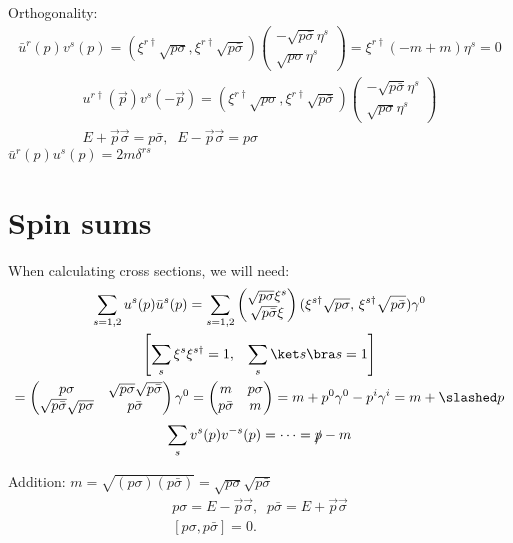 \documentclass[]{scrartcl}
\begin{document}
Orthogonality:
\begin{gather}
	\bar u^r(p) v^s(p) = (\xi^{r\dagger} \sqrt{p\sigma}, \xi^{r\dagger}\sqrt{p\bar\sigma})
	\begin{pmatrix}
		-\sqrt{p\bar\sigma}\eta^s \\ \sqrt{p\sigma}\eta^s
	\end{pmatrix} = \xi^{r\dagger}(-m + m)\eta^s = 0
\end{gather}
\begin{gather}
	u^{r\dagger}(\vec p)v^s(-\vec p) = (\xi^{r\dagger}\sqrt{p\sigma}, \xi^{r\dagger}\sqrt{p\bar\sigma})
	\begin{pmatrix}
		-\sqrt{p\bar\sigma}\eta^s\\
		\sqrt{p\sigma}\eta^s
	\end{pmatrix}\\
	E + \vec p \vec\sigma = p\bar\sigma,\;\; E - \vec p \vec\sigma = p\sigma
\end{gather}
$\bar u^r(p)u^s(p) = 2m\delta^{rs}$

\section{Spin sums}
When calculating cross sections, we will need:
\begin{gather}
	\sum_{s = 1,2} u^s(p)\bar u^s(p) = 
	\sum_{s=1,2}
	\begin{pmatrix}
		\sqrt{p\sigma}\xi^s \\ \sqrt{p\bar\sigma}\xi
	\end{pmatrix}
	(\xi^{s\dagger}\sqrt{p\sigma},\, \xi^{s\dagger}\sqrt{p\bar\sigma})\gamma^0\\
	\left[\sum_s \xi^s \xi^{s\dagger} = 1,\;\;\; \sum_s \ket s \bra s = 1\right]\\
	=
	\begin{pmatrix}
		p\sigma & \sqrt{p\sigma}\sqrt{p\bar\sigma}\\
		\sqrt{p\bar\sigma}\sqrt{p\sigma} & p\bar\sigma
	\end{pmatrix} \gamma^0 =
	\begin{pmatrix}
		m & p\sigma\\
		p\bar\sigma & m
	\end{pmatrix} = m + p^0\gamma^0 - p^i\gamma^i = m + \slashed p
\end{gather}
\begin{gather}
	\sum_s v^s(p)v^{-s}(p) = \cdots = \slashed p - m
\end{gather}

Addition: $m = \sqrt{(p\sigma)(p\bar\sigma)} = \sqrt{p\sigma}\sqrt{p\bar\sigma}$
\begin{gather}
	p\sigma = E - \vec p \vec\sigma,\;\; p\bar\sigma = E + \vec p \vec\sigma\\
	[p\sigma,p\bar\sigma] = 0.
\end{gather}
\end{document}
